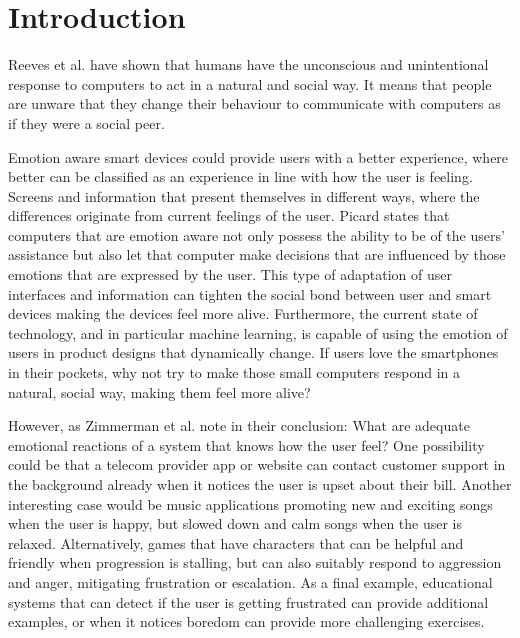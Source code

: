 \documentclass{sigchi}
\begin{document}
\section{Introduction} %
\label{sec:introduction}

Reeves et al. \cite{Reeves1998} have shown that humans have the unconscious and unintentional response to computers to act in a natural and social way. It means that people are unware that they change their behaviour to communicate with computers as if they were a social peer.


Emotion aware smart devices could provide users with a better experience, where better can be classified as an experience in line with how the user is feeling. Screens and information that present themselves in different ways, where the differences originate from current feelings of the user. Picard \cite{Picard1995} states that computers that are emotion aware not only possess the ability to be of the users' assistance but also let that computer make decisions that are influenced by those emotions that are expressed by the user. This type of adaptation of user interfaces and information can tighten the social bond between user and smart devices making the devices feel more alive. Furthermore, the current state of technology, and in particular machine learning, is capable of using the emotion of users in product designs that dynamically change. If users love the smartphones in their pockets, why not try to make those small computers respond in a natural, social way, making them feel more alive?

However, as Zimmerman et al. \cite{Zimmermann2003} note in their conclusion: What are adequate emotional reactions of a system that knows how the user feel? One possibility could be that a telecom provider app or website can contact customer support in the background already when it notices the user is upset about their bill. Another interesting case would be music applications promoting new and exciting songs when the user is happy, but slowed down and calm songs when the user is relaxed. Alternatively, games that have characters that can be helpful and friendly when progression is stalling, but can also suitably respond to aggression and anger, mitigating frustration or escalation. As a final example, educational systems that can detect if the user is getting frustrated can provide additional examples, or when it notices boredom can provide more challenging exercises.
\end{document}
